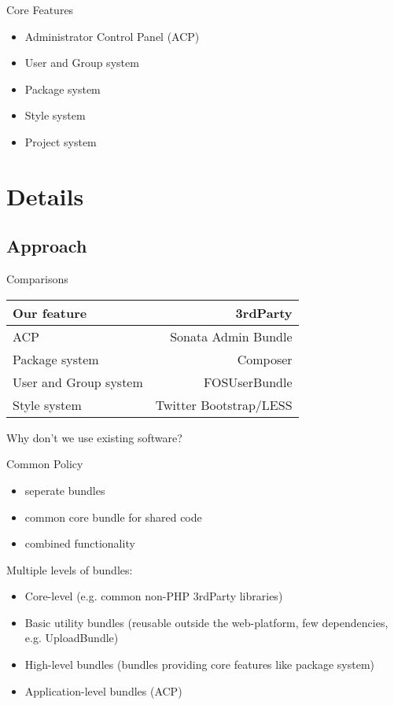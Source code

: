 \documentclass{beamer}
\begin{document}
	\begin{frame}{Core Features}
		\begin{itemize}
			\item Administrator Control Panel (ACP)
			\item User and Group system
			\item Package system
			\item Style system
			\item Project system
		\end{itemize}
	\end{frame}
	
	\section{Details}
	\subsection{Approach}
	\begin{frame}{Comparisons}
		\begin{table}
			\begin{tabular}{l|r}
				Our feature & 3rdParty \\
				\hline
				ACP & Sonata Admin Bundle \\
				Package system & Composer \\
				User and Group system & FOSUserBundle \\
				Style system & Twitter Bootstrap/LESS
			\end{tabular}
		\end{table}
		
		\centering Why don't we use existing software?
	\end{frame}
	
	\begin{frame}{Common Policy}
		\begin{itemize}
			\item seperate bundles
			\item common core bundle for shared code
			\item combined functionality
		\end{itemize}
		
		Multiple levels of bundles:
		\begin{itemize}
			\item Core-level (e.g. common non-PHP 3rdParty libraries)
			\item Basic utility bundles (reusable outside the web-platform, few dependencies, e.g. UploadBundle)
			\item High-level bundles (bundles providing core features like package system)
			\item Application-level bundles (ACP) 
		\end{itemize}
	\end{frame}
\end{document}
